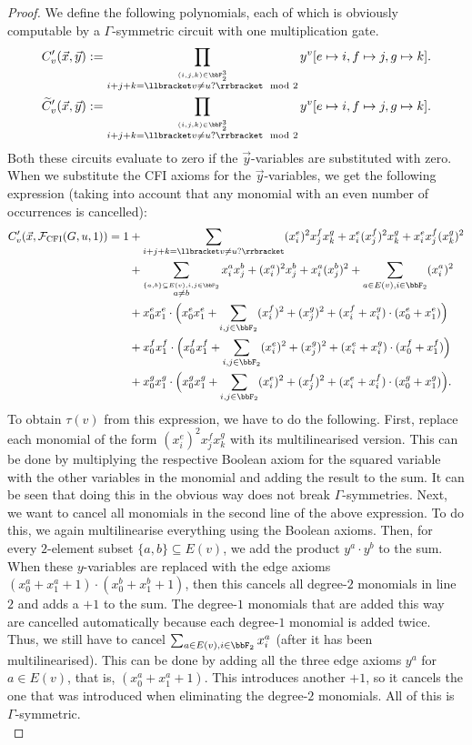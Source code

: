 \documentclass[10pt,a4paper]{article}
\newcommand{\Ff}{{\cal F}}
\newcommand{\CFI}{\Ff_{\mathrm{CFI}}}
\begin{document}
\begin{proof}
	We define the following polynomials, each of which is obviously computable by a $\Gamma$-symmetric circuit with one multiplication gate.
	\begin{align*}
		C'_v(\vec x, \vec y) &:= \prod_{\stackrel{(i,j,k) \in \bbF_2^3}{i+j+k = \llbracket v \neq u? \rrbracket \mod 2}} y^v[e \mapsto i, f \mapsto j, g \mapsto k].\\
		\widetilde{C}'_v(\vec x, \vec y) &:= \prod_{\stackrel{(i,j,k) \in \bbF_2^3}{i+j+k = \llbracket v \neq u? \rrbracket \mod 2}} y^v[e \mapsto i, f \mapsto j, g \mapsto k].
	\end{align*}
	Both these circuits evaluate to zero if the $\vec y$-variables are substituted with zero. When we substitute the CFI axioms for the $\vec y$-variables, we get the following expression (taking into account that any monomial with an even number of occurrences is cancelled):
	\begin{align*}
		C'_v(\vec x, \CFI(G, u, 1)) = 1 &+ \sum_{i+j+k = \llbracket v \neq u? \rrbracket} (x^e_i)^2x^f_jx^g_k + x^e_i(x^f_j)^2x^g_k + x^e_ix^f_j(x^g_k)^2\\
		&+ \sum_{\stackrel{\{ a,b\} \subseteq E(v), i,j \in \bbF_2}{a \neq b}} x^a_ix^b_j + (x^a_i)^2x^b_j + x^a_i(x^b_j)^2  + \sum_{a\in E(v), i \in \bbF_2} (x^a_i)^2\\
		&+x^e_0x^e_1 \cdot \Big(x^e_0x^e_1+\sum_{i,j \in \bbF_2} (x^f_i)^2+(x^g_j)^2 + (x_i^f+ x_i^g) \cdot (x_0^e + x_1^e)  \Big)\\
		&+ x^f_0x^f_1 \cdot \Big(x^f_0x^f_1+\sum_{i,j \in \bbF_2} (x^e_i)^2+(x^g_j)^2 + (x_i^e+ x_i^g) \cdot (x_0^f + x_1^f) \Big)\\
		&+ x^g_0x^g_1 \cdot \Big(x^g_0x^g_1+\sum_{i,j \in \bbF_2} (x^e_i)^2+(x^f_j)^2 + (x_i^e+ x_i^f) \cdot (x_0^g + x_1^g) \Big).   
	\end{align*}	
	To obtain $\tau(v)$ from this expression, we have to do the following. First, replace each monomial of the form $(x^e_i)^2x^f_jx^g_k$ with its multilinearised version. This can be done by multiplying the respective Boolean axiom for the squared variable with the other variables in the monomial and adding the result to the sum. It can be seen that doing this in the obvious way does not break $\Gamma$-symmetries. Next, we want to cancel all monomials in the second line of the above expression. To do this, we again multilinearise everything using the Boolean axioms. Then, for every $2$-element subset $\{a,b\} \subseteq E(v)$, we add the product $y^a \cdot y^b$ to the sum. When these $y$-variables are replaced with the edge axioms $(x^a_0 + x^a_1 +1) \cdot (x^b_0 + x^b_1 +1)$, then this cancels all degree-$2$ monomials in line $2$ and adds a $+1$ to the sum. The degree-$1$ monomials that are added this way are cancelled automatically because each degree-$1$ monomial is added twice. Thus, we still have to cancel $\sum_{a\in E(v), i \in \bbF_2} x^a_i$ (after it has been multilinearised). This can be done by adding all the three edge axioms $y^a$ for $a \in E(v)$, that is, $(x^a_0 + x^a_1 +1)$. This introduces another $+1$, so it cancels the one that was introduced when eliminating the degree-$2$ monomials. All of this is $\Gamma$-symmetric.\\

\end{proof}
\end{document}

